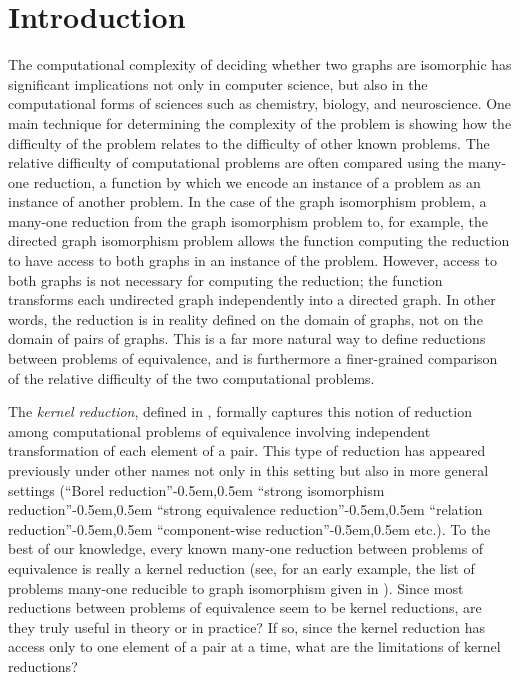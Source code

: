 \section{Introduction}

The computational complexity of deciding whether two graphs are isomorphic has significant implications not only in computer science, but also in the computational forms of sciences such as chemistry, biology, and neuroscience.
One main technique for determining the complexity of the problem is showing how the difficulty of the problem relates to the difficulty of other known problems.
The relative difficulty of computational problems are often compared using the many-one reduction, a function by which we encode an instance of a problem as an instance of another problem.
In the case of the graph isomorphism problem, a many-one reduction from the graph isomorphism problem to, for example, the directed graph isomorphism problem allows the function computing the reduction to have access to both graphs in an instance of the problem.
However, access to both graphs is not necessary for computing the reduction; the function transforms each undirected graph independently into a directed graph.
In other words, the reduction is in reality defined on the domain of graphs, not on the domain of pairs of graphs.
This is a far more natural way to define reductions between problems of equivalence, and is furthermore a finer-grained comparison of the relative difficulty of the two computational problems.

The \emph{kernel reduction}, defined in \autocite[Definition~4.13]{fg11}, formally captures this notion of reduction among computational problems of equivalence involving independent transformation of each element of a pair.
This type of reduction has appeared previously under other names not only in this setting but also in more general settings (``Borel reduction''\kern-0.5em,\kern0.5em ``strong isomorphism reduction''\kern-0.5em,\kern0.5em ``strong equivalence reduction''\kern-0.5em,\kern0.5em ``relation reduction''\kern-0.5em,\kern0.5em ``component-wise reduction''\kern-0.5em,\kern0.5em etc.).
To the best of our knowledge, every known many-one reduction between problems of equivalence is really a kernel reduction (see, for an early example, the list of problems many-one reducible to graph isomorphism given in \autocite{bc79}).
Since most reductions between problems of equivalence seem to be kernel reductions, are they truly useful in theory or in practice?
If so, since the kernel reduction has access only to one element of a pair at a time, what are the limitations of kernel reductions?

